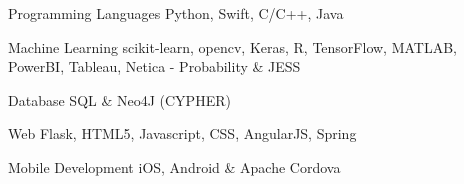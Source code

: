 

\begin{cvskills}

  \cvskill
    {Programming Languages} %
    {Python, Swift, C/C++, Java} %

  \cvskill
    {Machine Learning} %
    {scikit-learn, opencv, Keras, R, TensorFlow, MATLAB, PowerBI, Tableau, Netica - Probability \& JESS} %

  \cvskill
    {Database} %
    {SQL \& Neo4J (CYPHER)} %

  \cvskill
    {Web} %
    {Flask,  HTML5, Javascript, CSS, AngularJS, Spring} %

  \cvskill
    {Mobile Development} %
    {iOS, Android \& Apache Cordova} %
\end{cvskills}
